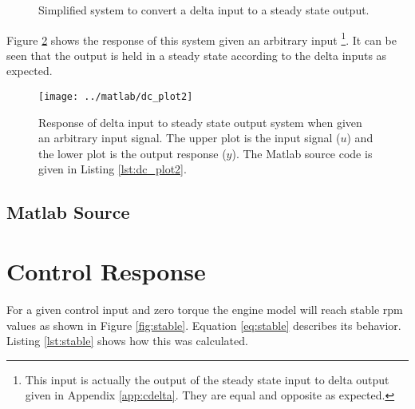\documentclass{article}
\begin{document}
\begin{figure}[!htbp]
\begin{center}


\end{center}
\caption{Simplified system to convert a delta input to
a steady state output.}
\label{fig:dc1s}
\end{figure}

Figure \ref{fig:dc_plot2} shows the response of this system given
an arbitrary input
\footnote{This input is actually the output of the steady state input
to delta output given in Appendix \ref{app:cdelta}.
They are equal and opposite as expected.}.
It can be seen that the output is held in a steady state according
to the delta inputs as expected.

\begin{figure}[htbp!]
\texttt{[image: ../matlab/dc\_plot2]}
\caption{Response of delta input to steady state output system
when given an arbitrary input signal.
The upper plot is the input signal ($u$) and the lower plot is
the output response ($y$).
The Matlab source code is given in Listing \ref{lst:dc_plot2}.
}
\label{fig:dc_plot2}
\end{figure}

\clearpage
\subsection{Matlab Source}
\label{app:dcsrc}

\nocite{octave}




\clearpage
\section{Control Response}
\label{app:contrpm}

For a given control input and zero torque the engine model will
reach stable rpm values as shown in Figure \ref{fig:stable}.
Equation \ref{eq:stable} describes its behavior.
Listing \ref{lst:stable} shows how this was calculated.
\end{document}
